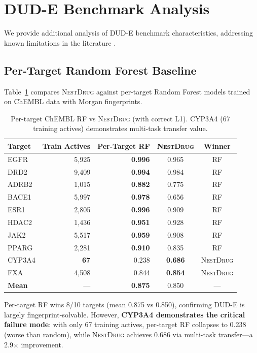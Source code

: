 \documentclass{article}
\newcommand{\methodname}{\textsc{NestDrug}}
\begin{document}
\section{DUD-E Benchmark Analysis}
\label{app:dude_analysis}

We provide additional analysis of DUD-E benchmark characteristics, addressing known limitations in the literature \citep{wallach_2018_dude_bias}.

\subsection{Per-Target Random Forest Baseline}

Table~\ref{tab:per_target_rf} compares \methodname{} against per-target Random Forest models trained on ChEMBL data with Morgan fingerprints.

\begin{table}[h]
\caption{Per-target ChEMBL RF vs \methodname{} (with correct L1). CYP3A4 (67 training actives) demonstrates multi-task transfer value.}
\label{tab:per_target_rf}
\centering
\small
\begin{tabular}{@{}lrrcc@{}}
\toprule
Target & Train Actives & Per-Target RF & \methodname{} & Winner \\
\midrule
EGFR & 5,925 & \textbf{0.996} & 0.965 & RF \\
DRD2 & 9,409 & \textbf{0.994} & 0.984 & RF \\
ADRB2 & 1,015 & \textbf{0.882} & 0.775 & RF \\
BACE1 & 5,997 & \textbf{0.978} & 0.656 & RF \\
ESR1 & 2,805 & \textbf{0.996} & 0.909 & RF \\
HDAC2 & 1,436 & \textbf{0.951} & 0.928 & RF \\
JAK2 & 5,517 & \textbf{0.959} & 0.908 & RF \\
PPARG & 2,281 & \textbf{0.910} & 0.835 & RF \\
CYP3A4 & \textbf{67} & 0.238 & \textbf{0.686} & \methodname{} \\
FXA & 4,508 & 0.844 & \textbf{0.854} & \methodname{} \\
\midrule
\textbf{Mean} & --- & \textbf{0.875} & 0.850 & --- \\
\bottomrule
\end{tabular}
\end{table}

Per-target RF wins 8/10 targets (mean 0.875 vs 0.850), confirming DUD-E is largely fingerprint-solvable. However, \textbf{CYP3A4 demonstrates the critical failure mode}: with only 67 training actives, per-target RF collapses to 0.238 (worse than random), while \methodname{} achieves 0.686 via multi-task transfer---a 2.9$\times$ improvement.
\end{document}
